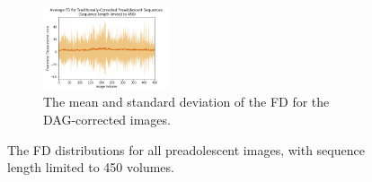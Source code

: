 \begin{figure}[t]
	\begin{subfigure}{0.9\textwidth}
		\centering
		\includegraphics[width=0.4\textwidth]{6/figures/pread-trad-fd-450.png}
		\caption{The mean and standard deviation of the FD for the DAG-corrected images.}
	\end{subfigure}
\caption{The FD distributions for all preadolescent images, with sequence length limited to 450 volumes.}
\label{fig:pread-fd-450}
\end{figure}

